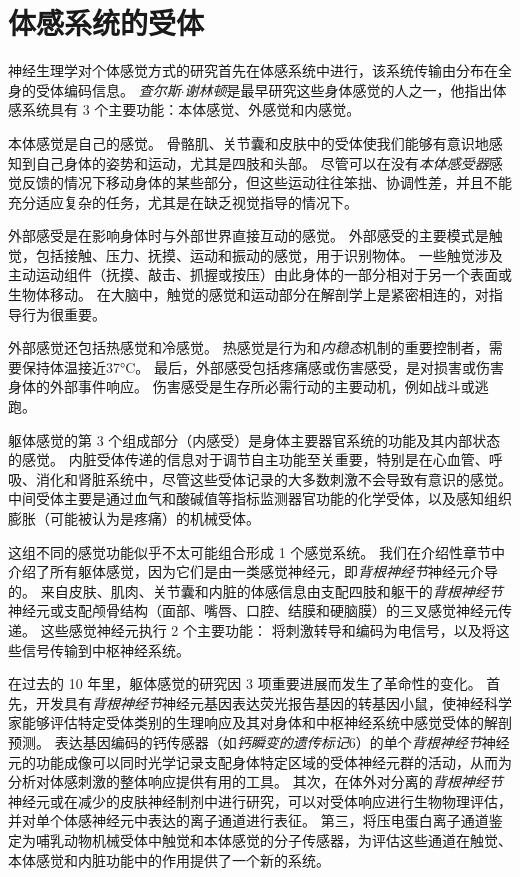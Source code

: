 \chapter{体感系统的受体} \label{chap:chap18}

神经生理学对个体感觉方式的研究首先在体感系统中进行，该系统传输由分布在全身的受体编码信息。
\textit{查尔斯$\cdot$谢林顿}是最早研究这些身体感觉的人之一，他指出体感系统具有 3 个主要功能：本体感觉、外感觉和内感觉。


本体感觉是自己的感觉。
骨骼肌、关节囊和皮肤中的受体使我们能够有意识地感知到自己身体的姿势和运动，尤其是四肢和头部。
尽管可以在没有\textit{本体感受器}感觉反馈的情况下移动身体的某些部分，但这些运动往往笨拙、协调性差，并且不能充分适应复杂的任务，尤其是在缺乏视觉指导的情况下。


外部感受是在影响身体时与外部世界直接互动的感觉。
外部感受的主要模式是触觉，包括接触、压力、抚摸、运动和振动的感觉，用于识别物体。
一些触觉涉及主动运动组件（抚摸、敲击、抓握或按压）由此身体的一部分相对于另一个表面或生物体移动。
在大脑中，触觉的感觉和运动部分在解剖学上是紧密相连的，对指导行为很重要。


外部感觉还包括热感觉和冷感觉。
热感觉是行为和\textit{内稳态}机制的重要控制者，需要保持体温接近37°C。
最后，外部感受包括疼痛感或伤害感受，是对损害或伤害身体的外部事件响应。
伤害感受是生存所必需行动的主要动机，例如战斗或逃跑。


躯体感觉的第 3 个组成部分（内感受）是身体主要器官系统的功能及其内部状态的感觉。
内脏受体传递的信息对于调节自主功能至关重要，特别是在心血管、呼吸、消化和肾脏系统中，尽管这些受体记录的大多数刺激不会导致有意识的感觉。
中间受体主要是通过血气和酸碱值等指标监测器官功能的化学受体，以及感知组织膨胀（可能被认为是疼痛）的机械受体。


这组不同的感觉功能似乎不太可能组合形成 1 个感觉系统。
我们在介绍性章节中介绍了所有躯体感觉，因为它们是由一类感觉神经元，即\textit{背根神经节}神经元介导的。
来自皮肤、肌肉、关节囊和内脏的体感信息由支配四肢和躯干的\textit{背根神经节}神经元或支配颅骨结构（面部、嘴唇、口腔、结膜和硬脑膜）的三叉感觉神经元传递。
这些感觉神经元执行 2 个主要功能：
将刺激转导和编码为电信号，以及将这些信号传输到中枢神经系统。


在过去的 10 年里，躯体感觉的研究因 3 项重要进展而发生了革命性的变化。
首先，开发具有\textit{背根神经节}神经元基因表达荧光报告基因的转基因小鼠，使神经科学家能够评估特定受体类别的生理响应及其对身体和中枢神经系统中感觉受体的解剖预测。
表达基因编码的钙传感器（如\textit{钙瞬变的遗传标记}6）的单个\textit{背根神经节}神经元的功能成像可以同时光学记录支配身体特定区域的受体神经元群的活动，从而为分析对体感刺激的整体响应提供有用的工具。
其次，在体外对分离的\textit{背根神经节}神经元或在减少的皮肤神经制剂中进行研究，可以对受体响应进行生物物理评估，并对单个体感神经元中表达的离子通道进行表征。
第三，将压电蛋白离子通道鉴定为哺乳动物机械受体中触觉和本体感觉的分子传感器，为评估这些通道在触觉、本体感觉和内脏功能中的作用提供了一个新的系统。


